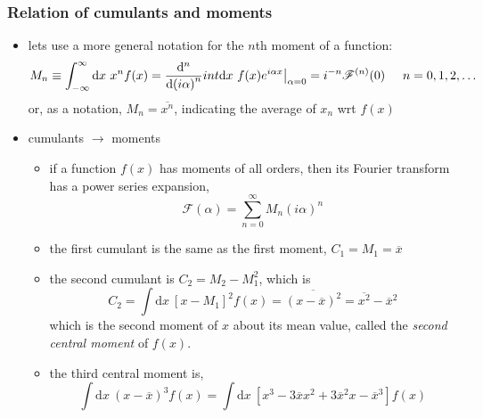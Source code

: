 \documentclass[../jaynes_prob_theory_notes.tex]{subfiles}
\begin{document}
            \subsubsection{Relation of cumulants and moments}
                \begin{itemize}
                    \item lets use a more general notation for the $n$th moment of a function:
                        \begin{equation*}
                            M_n \equiv \infint \mathrm{d}x~x^{n}f(x) = \frac{{\deriv}^n}{{\deriv}{(i\alpha)}^n} int \mathrm{d}x~f(x)e^{i{\alpha}x} \at[\big]{\alpha = 0} = i^{-n}\mathscr{F}^{(n)}(0) \hspace{0.5cm} n = 0, 1, 2, \ldots
                        \end{equation*}
                        or, as a notation, $M_n = \overline{x^{n}}$, indicating the average of $x_n$ wrt $f(x)$
                    \item cumulants $\rightarrow$ moments 
                        \begin{itemize}
                            \item if a function $f(x)$ has moments of all orders, then its Fourier transform has a power series expansion,
                                \begin{equation*}
                                    \mathscr{F}(\alpha) = \sum^{\infty}_{n=0} M_{n}{(i\alpha)}^{n}
                                \end{equation*}
                            \item the first cumulant is the same as the first moment, $C_1 = M_1 = \overline{x}$
                            \item the second cumulant is $C_2 = M_2 - M^{2}_1$, which is
                                \begin{equation*}
                                    C_2 = \int \mathrm{d}x~{[x - M_1]}^{2}f(x) = \overline{{(x-\overline{x})}^2} = \overline{x^2} - \overline{x}^2
                                \end{equation*}
                                which is the second moment of $x$ about its mean value, called the \textit{second central moment} of $f(x)$.
                            \item the third central moment is,
                                \begin{equation*}
                                    \int \mathrm{d}x~{(x-\overline{x})}^{3}f(x) = \int \mathrm{d}x~\left[x^3 - 3\overline{x}x^2 + 3\overline{x}^{2}x - \overline{x}^3 \right] f(x)

\end{equation*}
\end{itemize}
\end{itemize}
\end{document}
